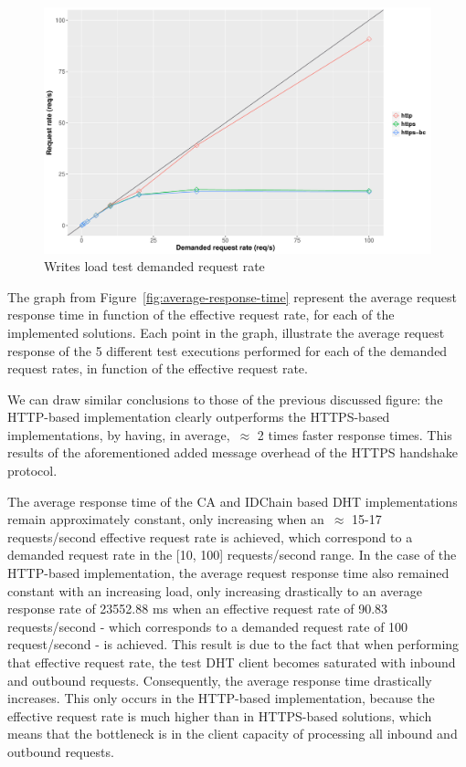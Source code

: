 \begin{figure}[h!]
  \centering
  \includegraphics[scale=0.4]{Figures/evaluation/request-rate-writes-linear.pdf}
  \caption{Writes load test demanded request rate}
\label{fig:demanded-request-rate}
\end{figure}


The graph from Figure~\ref{fig:average-response-time} represent the average request response time in function of the effective request rate, for each of the implemented solutions.
Each point in the graph, illustrate the average request response of the 5 different test executions performed for each of the demanded request rates, in function of the effective request rate.

We can draw similar conclusions to those of the previous discussed figure: the HTTP-based implementation clearly outperforms the HTTPS-based implementations, by having, in average,~$\approx$ 2 times faster response times.
This results of the aforementioned added message overhead of the HTTPS handshake protocol.

The average response time of the CA and IDChain based DHT implementations remain approximately constant, only increasing when an~$\approx$ 15-17 requests/second effective request rate is achieved, which correspond to a demanded request rate in the [10, 100] requests/second range.
In the case of the HTTP-based implementation, the average request response time also remained constant with an increasing load, only increasing drastically to an average response rate of 23552.88 ms when an effective request rate of 90.83 requests/second - which corresponds to a demanded request rate of 100 request/second - is achieved.
This result is due to the fact that when performing that effective request rate, the test DHT client becomes saturated with inbound and outbound requests. Consequently, the average response time drastically increases.
This only occurs in the HTTP-based implementation, because the effective request rate is much higher than in HTTPS-based solutions, which means that the bottleneck is in the client capacity of processing all inbound and outbound requests.

